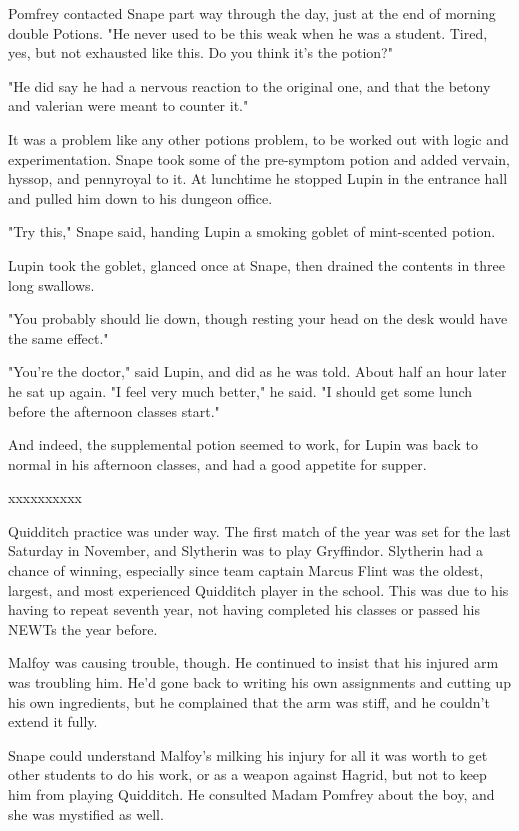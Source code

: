 \documentclass[a4paper,11pt]{article}
\begin{document}
Pomfrey contacted Snape part way through the day, just at the end of morning double Potions. "He never used to be this weak when he was a student. Tired, yes, but not exhausted like this. Do you think it's the potion?"

"He did say he had a nervous reaction to the original one, and that the betony and valerian were meant to counter it."

It was a problem like any other potions problem, to be worked out with logic and experimentation. Snape took some of the pre-symptom potion and added vervain, hyssop, and pennyroyal to it. At lunchtime he stopped Lupin in the entrance hall and pulled him down to his dungeon office.

"Try this," Snape said, handing Lupin a smoking goblet of mint-scented potion.

Lupin took the goblet, glanced once at Snape, then drained the contents in three long swallows.

"You probably should lie down, though resting your head on the desk would have the same effect."

"You're the doctor," said Lupin, and did as he was told. About half an hour later he sat up again. "I feel very much better," he said. "I should get some lunch before the afternoon classes start."

And indeed, the supplemental potion seemed to work, for Lupin was back to normal in his afternoon classes, and had a good appetite for supper.

xxxxxxxxxx

Quidditch practice was under way. The first match of the year was set for the last Saturday in November, and Slytherin was to play Gryffindor. Slytherin had a chance of winning, especially since team captain Marcus Flint was the oldest, largest, and most experienced Quidditch player in the school. This was due to his having to repeat seventh year, not having completed his classes or passed his NEWTs the year before.

Malfoy was causing trouble, though. He continued to insist that his injured arm was troubling him. He'd gone back to writing his own assignments and cutting up his own ingredients, but he complained that the arm was stiff, and he couldn't extend it fully.

Snape could understand Malfoy's milking his injury for all it was worth to get other students to do his work, or as a weapon against Hagrid, but not to keep him from playing Quidditch. He consulted Madam Pomfrey about the boy, and she was mystified as well.
\end{document}
